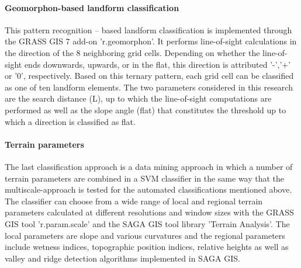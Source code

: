 \documentclass[preprint,12pt,authoryear]{elsarticle}
\begin{document}
\paragraph{Geomorphon-based landform classification \cite{Jasiewicz2013}}
This pattern recognition – based landform classification is implemented through the GRASS GIS 7 add-on 'r.geomorphon'. It performs line-of-sight calculations in the direction of the 8 neighboring grid cells.  Depending on whether the line-of-sight ends downwards,  upwards, or in the flat, this direction is attributed '-','+' or '0', respectively.  Based on this ternary pattern, each grid cell can be classified as one of ten landform elements. The two parameters considered in this research are the search distance (L), up to which the line-of-sight computations are performed as well as the slope angle (flat) that constitutes the threshold up to which a direction is classified as flat. 
\paragraph{Terrain parameters}
The last classification approach is a data mining approach in which a number of terrain parameters are combined in a SVM classifier in the same way that the multiscale-approach is tested for the automated classifications mentioned above. The classifier can choose from a wide range of local and regional terrain parameters calculated at different resolutions and window sizes with the GRASS GIS tool 'r.param.scale' and the SAGA GIS tool library 'Terrain Analysis'. The local parameters are slope and various curvatures and the regional parameters include wetness indices, topographic position indices, relative heights as well as valley and ridge detection algorithms implemented in SAGA GIS.  
\end{document}
